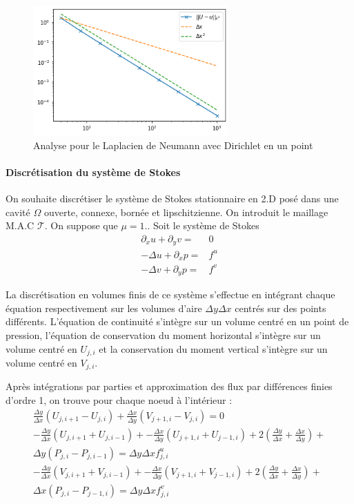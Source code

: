 \begin{figure}[htp]
    \centering
    \includegraphics[width=7.5cm]{Images/stokes/Laplace Neumann 2D/analyse.png}
    \caption{Analyse pour le Laplacien de Neumann avec Dirichlet en un point}
\end{figure}

\paragraph{Discrétisation du système de Stokes} On souhaite discrétiser le système de Stokes stationnaire en 2.D posé dans une cavité $\Omega$ ouverte, connexe, bornée et lipschitzienne. On introduit le maillage M.A.C $\mathcal{T}$. On suppose que $\mu = 1.$. Soit le système de Stokes
\begin{align*}
    \partial_x u + \partial_y v = & 0 \\
    -\Delta u + \partial_x p = & f^u \\
    -\Delta v + \partial_y p = & f^v
\end{align*}

La discrétisation en volumes finis de ce système s'effectue en intégrant chaque équation respectivement sur les volumes d'aire $\Delta y \Delta x$ centrés sur des points différents. L'équation de continuité s'intègre sur un volume centré en un point de pression, l'équation de conservation du moment horizontal s'intègre sur un volume centré en $U_{j,i}$ et la conservation du moment vertical s'intègre sur un volume centré en $V_{j,i}$.

Après intégrations par parties et approximation des flux par différences finies d'ordre 1, on trouve pour chaque noeud à l'intérieur :
\begin{align*}
    \frac{\Delta y}{\Delta x} \left( U_{j,i+1} - U_{j,i} \right) + \frac{\Delta x}{\Delta y} \left( V_{j+1,i} - V_{j,i} \right) = 0 \\
    -\frac{\Delta y}{\Delta x} \left( U_{j,i+1} + U_{j,i-1} \right) + -\frac{\Delta x}{\Delta y} \left( U_{j+1,i} + U_{j-1,i} \right) + 2\left( \frac{\Delta y}{\Delta x} + \frac{\Delta x}{\Delta y} \right) + \\ \Delta y \left( P_{j,i} - P_{j,i-1} \right) = \Delta y \Delta x f^u_{j,i} \\
    -\frac{\Delta y}{\Delta x} \left( V_{j,i+1} + V_{j,i-1} \right) + -\frac{\Delta x}{\Delta y} \left( V_{j+1,i} + V_{j-1,i} \right) + 2\left( \frac{\Delta y}{\Delta x} + \frac{\Delta x}{\Delta y} \right) + \\ \Delta x \left( P_{j,i} - P_{j-1, i} \right) = \Delta y \Delta x f^v_{j,i}
\end{align*}

